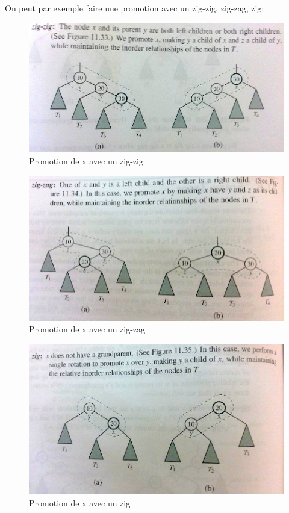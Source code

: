 \documentclass[a4paper]{article}
\begin{document}
On peut par exemple faire une promotion avec un zig-zig, zig-zag, zig:
\begin{figure}[!h]
\begin{center}
\includegraphics[scale=0.4]{zig-zig.jpg}
\caption{Promotion de x avec un zig-zig}
\end{center}
\end{figure}
\begin{figure}[!h]
\begin{center}
\includegraphics[scale=0.4]{zig-zag.jpg}
\caption{Promotion de x avec un zig-zag}
\end{center}
\end{figure}
\begin{figure}[!h]
\begin{center}
\includegraphics[scale=0.4]{zig.jpg}
\caption{Promotion de x avec un zig}
\end{center}
\end{figure}
\end{document}

